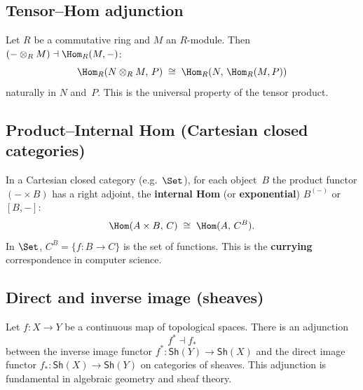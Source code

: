\subsection{Tensor--Hom adjunction}

\begin{example}\label{ex:tensor-hom}
Let $R$ be a commutative ring and $M$ an $R$-module.
Then $(-\otimes_R M) \dashv \Hom_R(M,-)$:
\[
    \Hom_R(N\otimes_R M,\, P) \;\cong\; \Hom_R(N,\,\Hom_R(M,P))
\]
naturally in $N$ and~$P$.  This is the universal property of the
tensor product.
\end{example}

\subsection{Product--Internal Hom (Cartesian closed categories)}

\begin{example}\label{ex:cartesian-closed}
In a Cartesian closed category (e.g.\ $\Set$), for each object~$B$
the product functor $(-\times B)$ has a right adjoint, the
\textbf{internal Hom} (or \textbf{exponential}) $B^{(-)}$ or $[B,-]$:
\[
    \Hom(A\times B,\,C) \;\cong\; \Hom(A,\,C^B).
\]
In $\Set$, $C^B = \{f\colon B\to C\}$ is the set of functions.
This is the \textbf{currying} correspondence in computer science.
\end{example}

\subsection{Direct and inverse image (sheaves)}

\begin{example}\label{ex:sheaf-adjunction}
Let $f\colon X\to Y$ be a continuous map of topological spaces.
There is an adjunction
\[
    f^* \dashv f_*
\]
between the inverse image functor $f^*\colon\mathsf{Sh}(Y)\to\mathsf{Sh}(X)$
and the direct image functor $f_*\colon\mathsf{Sh}(X)\to\mathsf{Sh}(Y)$
on categories of sheaves.  This adjunction is fundamental in algebraic
geometry and sheaf theory.
\end{example}


